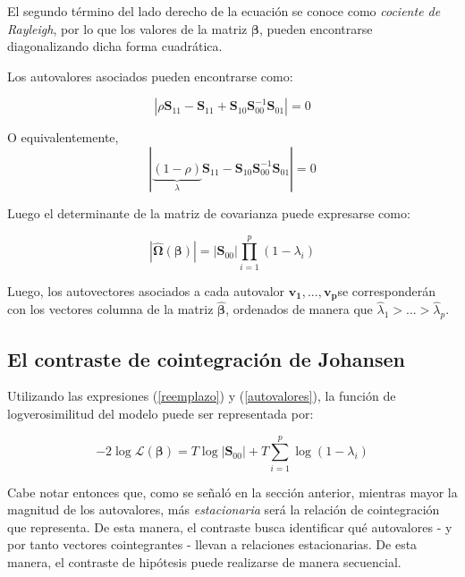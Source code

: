 \documentclass[12pt, twoside]{book}\usepackage[]{graphicx}\usepackage[]{color}
\numberwithin{equation}{section}
\numberwithin{theorem}{section}
\numberwithin{teorema}{section}
\numberwithin{defi}{section}
\numberwithin{prop}{section}
\numberwithin{defi}{section}
\theoremstyle{plain}
\begin{document}
El segundo término del lado derecho de la ecuación se conoce como \textit{cociente de Rayleigh}, por lo que los valores de la matriz $\boldsymbol{\beta}$, pueden encontrarse diagonalizando dicha forma cuadrática. 

Los autovalores asociados pueden encontrarse como: 

\begin{equation}
|\rho\mathbf{S}_{11}-\mathbf{S}_{11}+\mathbf{S}_{10}\mathbf{S}_{00}^{-1}\mathbf{S}_{01}|=0
\end{equation}

O equivalentemente, 
\begin{equation}
|\underbrace{(1-\rho)}_{\lambda}\mathbf{S}_{11}-\mathbf{S}_{10}\mathbf{S}_{00}^{-1}\mathbf{S}_{01}|=0
\end{equation}

Luego el determinante de la matriz de covarianza puede expresarse como: 

\begin{equation}\label{autovalores}
|\hat{\boldsymbol{\Omega}}(\boldsymbol{\beta})| = |\mathbf{S}_{00}|\prod_{i=1}^{p}(1-\lambda_{i})
\end{equation}

Luego, los autovectores asociados a cada autovalor $\mathbf{v_{1},...,v_{p}}$se corresponderán con los vectores columna de la matriz $\hat{\boldsymbol{\beta}}$, ordenados de manera que $\hat{\lambda}_{1}>...>\hat{\lambda}_{p}$.



\subsection{El contraste de cointegración de Johansen}

Utilizando las expresiones (\ref{reemplazo}) y (\ref{autovalores}), la función de logverosimilitud del modelo puede ser representada por: 

\begin{equation}
-2\log \mathcal{L}(\boldsymbol{\beta}) = T\log|\mathbf{S}_{00}|+T\sum_{i=1}^{p}\log(1-\lambda_{i})
\end{equation}

Cabe notar entonces que, como se señaló en la sección anterior, mientras mayor la magnitud de los autovalores, más \textit{estacionaria} será la relación de cointegración que representa. De esta manera, el contraste busca identificar qué autovalores - y por tanto vectores cointegrantes - llevan a relaciones estacionarias. De esta manera, el contraste de hipótesis puede realizarse de manera secuencial. 
\end{document}

